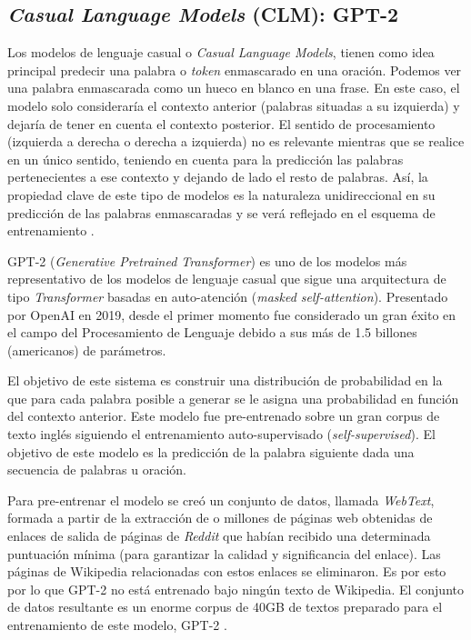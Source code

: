 \subsection{\textit{Casual Language Models} (CLM): GPT-2}

Los modelos de lenguaje casual o \textit{Casual Language Models}, tienen como idea principal predecir una palabra o \textit{token} enmascarado en una oración. Podemos ver una palabra enmascarada como un hueco en blanco en una frase. En este caso, el modelo solo consideraría el contexto anterior (palabras situadas a su izquierda) y dejaría de tener en cuenta el contexto posterior. El sentido de procesamiento (izquierda a derecha o derecha a izquierda) no es relevante mientras que se realice en un único sentido, teniendo en cuenta para la predicción las palabras pertenecientes a ese contexto y dejando de lado el resto de palabras. Así, la propiedad clave de este tipo de modelos es la naturaleza unidireccional en su predicción de las palabras enmascaradas y se verá reflejado en el esquema de entrenamiento \citep{rothman-2022}.


GPT-2 (\textit{Generative Pretrained Transformer}) es uno de los modelos más representativo de los modelos de lenguaje casual que sigue una arquitectura de tipo \textit{Transformer} basadas en auto-atención (\textit{masked self-attention}). Presentado por OpenAI en 2019, desde el primer momento fue considerado un gran éxito en el campo del Procesamiento de Lenguaje debido a sus más de 1.5 billones (americanos) de parámetros.

El objetivo de este sistema es construir una distribución de probabilidad en la que para cada palabra posible a generar se le asigna una probabilidad en función del contexto anterior. Este modelo fue pre-entrenado sobre un gran corpus de texto inglés siguiendo el entrenamiento auto-supervisado (\textit{self-supervised}). El objetivo de este modelo es la predicción de la palabra siguiente dada una secuencia de palabras u oración.


Para pre-entrenar el modelo se creó un conjunto de datos, llamada \textit{WebText}, formada a partir de la extracción de o millones de páginas web obtenidas de enlaces de salida de páginas de \textit{Reddit} que habían recibido una determinada puntuación mínima (para garantizar la calidad y significancia del enlace). Las páginas de Wikipedia relacionadas con estos enlaces se eliminaron. Es por esto por lo que GPT-2 no está entrenado bajo ningún texto de Wikipedia. El conjunto de datos resultante es un enorme corpus de 40GB de textos preparado para el entrenamiento de este modelo, GPT-2 \citep{radford2019language}.

